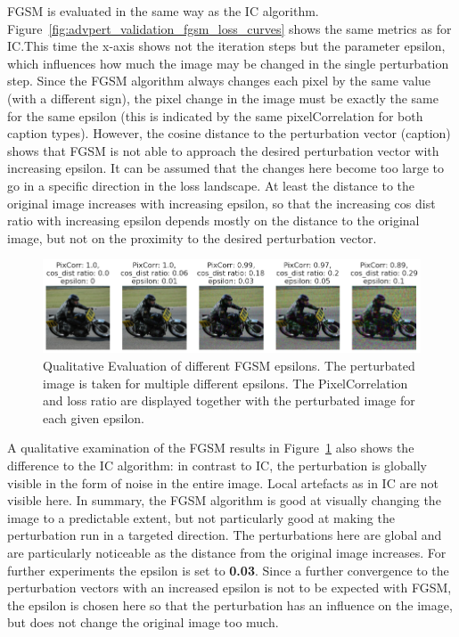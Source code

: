 FGSM is evaluated in the same way as the IC algorithm. Figure~\ref{fig:advpert_validation_fgsm_loss_curves} shows the same metrics as for IC.\@ This time the x-axis shows not the iteration steps but the parameter epsilon, which influences how much the image may be changed in the single perturbation step. Since the FGSM algorithm always changes each pixel by the same value (with a different sign), the pixel change in the image must be exactly the same for the same epsilon (this is indicated by the same pixelCorrelation for both caption types). However, the cosine distance to the perturbation vector (caption) shows that FGSM is not able to approach the desired perturbation vector with increasing epsilon. It can be assumed that the changes here become too large to go in a specific direction in the loss landscape. At least the distance to the original image increases with increasing epsilon, so that the increasing cos dist ratio with increasing epsilon depends mostly on the distance to the original image, but not on the proximity to the desired perturbation vector. 

    \begin{figure}[ht]
        \centering
        \includegraphics[width=1\textwidth]{plots/advpert_fgsm_qual_validation_evolution.png}
        \caption[Qualitative Evaluation of different FGSM epsilons]{Qualitative Evaluation of different FGSM epsilons. The perturbated image is taken for multiple different epsilons. The PixelCorrelation and loss ratio are displayed together with the perturbated image for each given epsilon.}\label{fig:advpert_fgsm_qual_validation_evolution}
    \end{figure}
    

A qualitative examination of the FGSM results in Figure~\ref{fig:advpert_fgsm_qual_validation_evolution} also shows the difference to the IC algorithm: in contrast to IC, the perturbation is globally visible in the form of noise in the entire image. Local artefacts as in IC are not visible here. In summary, the FGSM algorithm is good at visually changing the image to a predictable extent, but not particularly good at making the perturbation run in a targeted direction. The perturbations here are global and are particularly noticeable as the distance from the original image increases. For further experiments the epsilon is set to \textbf{0.03}. Since a further convergence to the perturbation vectors with an increased epsilon is not to be expected with FGSM, the epsilon is chosen here so that the perturbation has an influence on the image, but does not change the original image too much.

